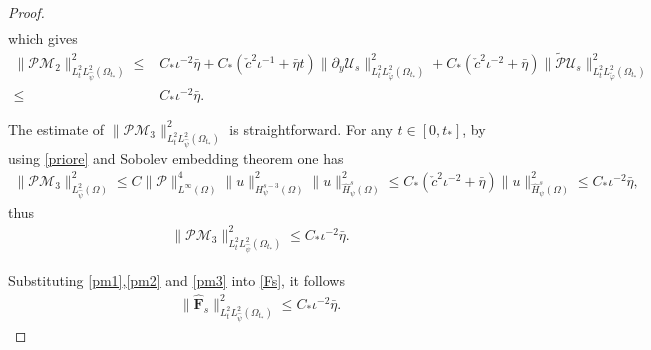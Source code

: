 \documentclass{amsart}
\numberwithin{equation}{section}
\begin{document}
\begin{proof}
\begin{align*}
\end{align*}
which gives
\begin{align}\label{pm2}
\|\mathcal{P}\mathcal{M}_{2}\|_{L_{t}^{2}L_{\hat{\psi}}^{2}(\Omega_{t_{*}})}^{2}
\leq& C_{*}\iota^{-2}\bar{\eta}
     +C_{*}(\check{c}^{2}\iota^{-1}+\bar{\eta}t)\|\partial_{y}\mathcal{U}_{s}\|_{L_{t}^{2}L_{\tilde{\varphi}}^{2}(\Omega_{t_{*}})}^{2}
     +C_{*}(\check{c}^{2}\iota^{-2}+\bar{\eta})\|\tilde{\mathcal{P}}\mathcal{U}_{s}\|_{L_{t}^{2}L_{\tilde{\varphi}}^{2}(\Omega_{t_{*}})}^{2}\\
\leq& C_{*}\iota^{-2}\bar{\eta}.\nonumber
\end{align}

The estimate of $\|\mathcal{P}\mathcal{M}_{3}\|_{L_{t}^{2}L_{\hat{\psi}}^{2}(\Omega_{t_{*}})}^{2}$ is straightforward. For any $t\in[0,t_{*}]$, by using \eqref{priore} and Sobolev embedding theorem one has
\begin{align*}
\|\mathcal{P}\mathcal{M}_{3}\|_{L_{\hat{\psi}}^{2}(\Omega)}^{2}
\leq C\|\mathcal{P}\|_{L^{\infty}(\Omega)}^{4}
      \|u\|_{H_{\psi}^{s-3}(\Omega)}^{2}
      \|u\|_{\hat{H}_{\psi}^{s}(\Omega)}^{2}
\leq C_{*}(\check{c}^{2}\iota^{-2}+\bar{\eta})\|u\|_{\hat{H}_{\psi}^{s}(\Omega)}^{2}
\leq  C_{*}\iota^{-2}\bar{\eta},
\end{align*}
thus
\begin{align}\label{pm3}
\|\mathcal{P}\mathcal{M}_{3}\|_{L_{t}^{2}L_{\hat{\psi}}^{2}(\Omega_{t_{*}})}^{2}
\leq C_{*}\iota^{-2}\bar{\eta}.
\end{align}

Substituting \eqref{pm1},\eqref{pm2} and \eqref{pm3} into \eqref{Fs}, it follows
\begin{align}\label{Fse}
\|\hat{\mathbf{F}}_{s}\|_{L_{t}^{2}L_{\hat{\psi}}^{2}(\Omega_{t_{*}})}^{2}\leq C_{*}\iota^{-2}\bar{\eta}.
\end{align}


\end{proof}
\end{document}
